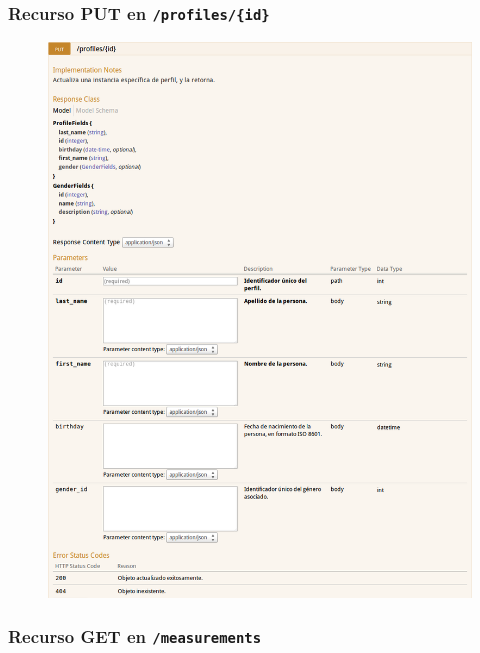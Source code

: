 \newpage


\subsubsection{Recurso PUT en \texttt{/profiles/\{id\}}}

\begin{figure}[h]
  \centering
  \includegraphics[width=\textwidth,height=.75\textheight,keepaspectratio]{img/especificacion_api/profileView_put}
  \label{profileView_put}
\end{figure}

\newpage


\subsubsection{Recurso GET en \texttt{/measurements}}

